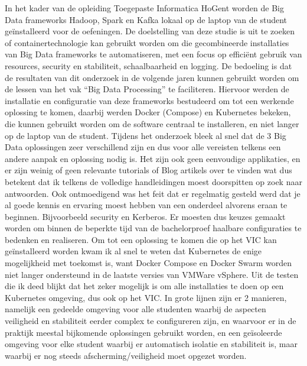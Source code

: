 In het kader van de opleiding Toegepaste Informatica HoGent worden de Big Data frameworks Hadoop, Spark en Kafka lokaal op de laptop van de student geïnstalleerd voor de oefeningen.
De doelstelling van deze studie is uit te zoeken of containertechnologie kan gebruikt worden om die gecombineerde installaties van Big Data frameworks te automatiseren, met een focus op efficiënt gebruik van resources, security en stabiliteit, schaalbaarheid en logging. De bedoeling is dat de resultaten van dit onderzoek in de volgende jaren kunnen gebruikt worden om de lessen van het vak ``Big Data Processing'' te faciliteren.
\newline
\newline
Hiervoor werden de installatie en configuratie van deze frameworks bestudeerd om tot een werkende oplossing te komen, daarbij werden Docker (Compose) en Kubernetes bekeken, die kunnen gebruikt worden om de software centraal te installeren, en niet langer op de laptop van de student.
\newline
\newline
Tijdens het onderzoek bleek al snel dat de 3 Big Data oplossingen zeer verschillend zijn en dus voor alle vereisten telkens een andere aanpak en oplossing nodig is.
Het zijn ook geen eenvoudige applikaties, en er zijn weinig of geen relevante tutorials of Blog artikels over te vinden wat dus betekent dat ik telkens de volledige handleidingen moest doorspitten op zoek naar antwoorden. Ook ontmoedigend was het feit dat er regelmatig gesteld werd dat je al goede kennis en ervaring moest hebben van een onderdeel alvorens eraan te beginnen. Bijvoorbeeld security en Kerberos.
\newline
Er moesten dus keuzes gemaakt worden om binnen de beperkte tijd van de bachelorproef haalbare configuraties te bedenken en realiseren.
\newline
\newline
Om tot een oplossing te komen die op het VIC kan geïnstalleerd worden kwam ik al snel te weten dat Kubernetes de enige mogelijkheid met toekomst is, want Docker Compose en Docker Swarm worden niet langer ondersteund in de laatste versies van VMWare vSphere.
\newline
\newline
Uit de testen die ik deed blijkt dat het zeker mogelijk is om alle installaties te doen op een Kubernetes omgeving, dus ook op het VIC. In grote lijnen zijn er 2 manieren, namelijk een gedeelde omgeving voor alle studenten waarbij de aspecten veiligheid en stabiliteit eerder complex te configureren zijn, en waarvoor er in de praktijk meestal bijkomende oplossingen gebruikt worden, en een geïsoleerde omgeving voor elke student waarbij er automatisch isolatie en stabiliteit is, maar waarbij er nog steeds afscherming/veiligheid moet opgezet worden.
